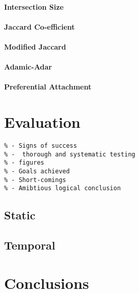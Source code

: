 \documentclass[a4paper,12pt,twoside,notitlepage]{report}
\begin{document}
\subsubsection{Intersection Size}

\subsubsection{Jaccard Co-efficient}

\subsubsection{Modified Jaccard}

\subsubsection{Adamic-Adar}

\subsubsection{Preferential Attachment}

\chapter{Evaluation}

\begin{verbatim}
% - Signs of success
% -  thorough and systematic testing
% - figures
% - Goals achieved
% - Short-comings
% - Amibtious logical conclusion 
\end{verbatim}

\section{Static}

\section{Temporal}

\chapter{Conclusions}
\end{document}
